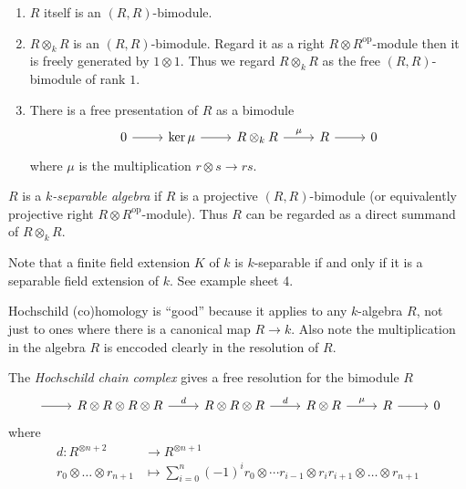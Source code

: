 \documentclass[a4paper]{article}
\newcommand{\op}{\mathrm{op}}
\begin{document}
\begin{note}\leavevmode
  \begin{enumerate}
  \item \(R\) itself is an \((R, R)\)-bimodule.
  \item \(R \otimes_k R\) is an \((R, R)\)-bimodule. Regard it as a right \(R \otimes R^\op\)-module then it is freely generated by \(1 \otimes 1\). Thus we regard \(R \otimes_k R\) as the free \((R, R)\)-bimodule of rank \(1\).
  \item There is a free presentation of \(R\) as a bimodule
    \[
      \begin{tikzcd}
        0 \ar[r] & \ker \mu \ar[r] & R \otimes_k R \ar[r, "\mu"] & R \ar[r] & 0
      \end{tikzcd}
    \]
    where \(\mu\) is the multiplication \(r \otimes s \to rs\).
  \end{enumerate}
\end{note}

\begin{definition}
  \(R\) is a \emph{\(k\)-separable algebra} if \(R\) is a projective \((R, R)\)-bimodule (or equivalently projective right \(R \otimes R^\op\)-module). Thus \(R\) can be regarded as a direct summand of \(R \otimes_k R\).
\end{definition}

Note that a finite field extension \(K\) of \(k\) is \(k\)-separable if and only if it is a separable field extension of \(k\). See example sheet 4.

\begin{remark}
  Hochschild (co)homology is ``good'' because it applies to any \(k\)-algebra \(R\), not just to ones where there is a canonical map \(R \to k\). Also note the multiplication in the algebra \(R\) is enccoded clearly in the resolution of \(R\).
\end{remark}

\begin{definition}
  The \emph{Hochschild chain complex} gives a free resolution for the bimodule \(R\)
  \[
    \begin{tikzcd}
      \ar[r] & R \otimes R \otimes R \otimes R \ar[r, "d"] & R \otimes R \otimes R \ar[r, "d"] & R \otimes R \ar[r, "\mu"] & R \ar[r] & 0
    \end{tikzcd}
  \]
  where
  \begin{align*}
    d: R^{\otimes n + 2} &\to R^{\otimes n + 1} \\
    r_0 \otimes \dots \otimes r_{n + 1} &\mapsto \sum_{i = 0}^n (-1)^i r_0 \otimes \cdots r_{i - 1} \otimes r_ir_{i + 1} \otimes \dots \otimes r_{n + 1}
  \end{align*}
\end{definition}
\end{document}

